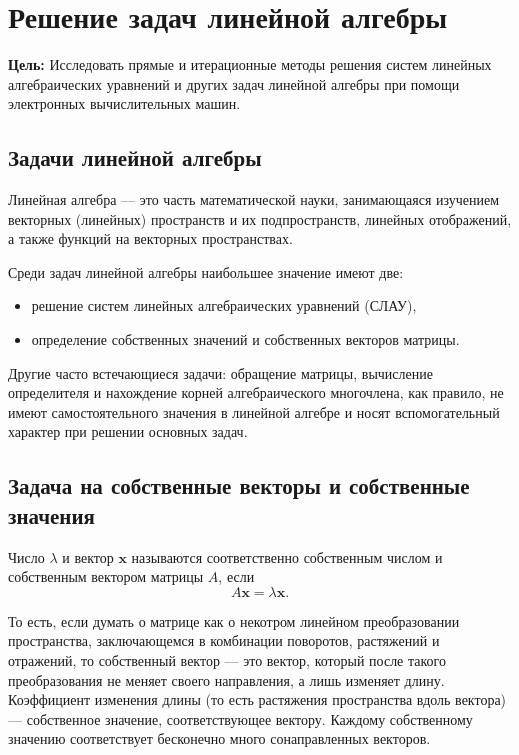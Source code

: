 \section{Решение задач линейной алгебры}

\noindent \textbf{Цель:} Исследовать прямые и итерационные методы
решения систем линейных алгебраических уравнений и других задач линейной
алгебры при помощи электронных вычислительных машин.

\subsection{Задачи линейной алгебры}

Линейная алгебра — это часть математической науки, занимающаяся изучением
векторных (линейных) пространств и их подпространств, линейных отображений,
а также функций на векторных пространствах.

Среди задач линейной алгебры наибольшее значение имеют две:
\begin{itemize}
\item решение систем линейных алгебраических уравнений (СЛАУ),
\item определение собственных значений и собственных векторов матрицы.
\end{itemize}
Другие часто встечающиеся задачи: обращение матрицы, вычисление определителя
и нахождение корней алгебраического многочлена, как правило, не имеют
самостоятельного значения в линейной алгебре и носят вспомогательный
характер при решении основных задач.


\subsection{Задача на собственные векторы и собственные значения}

Число $\lambda$ и вектор $\mathbf{x}$ называются соответственно
собственным числом и собственным вектором матрицы $A$, если
\[
A\mathbf{x}=\lambda\mathbf{x}.
\]


То есть, если думать о матрице как о некотром линейном преобразовании
пространства, заключающемся в комбинации поворотов, растяжений и отражений,
то собственный вектор — это вектор, который после такого преобразования
не меняет своего направления, а лишь изменяет длину. Коэффициент изменения
длины (то есть растяжения пространства вдоль вектора) — собственное
значение, соответствующее вектору. Каждому собственному значению соответствует
бесконечно много сонаправленных векторов.

